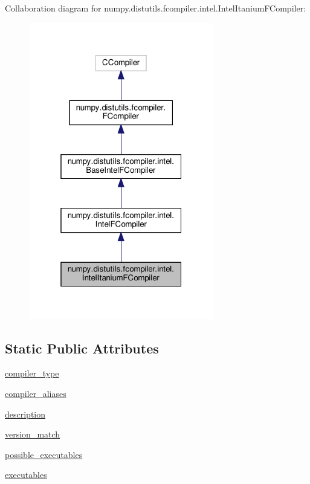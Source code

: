 Collaboration diagram for numpy.\+distutils.\+fcompiler.\+intel.\+Intel\+Itanium\+F\+Compiler\+:
\nopagebreak
\begin{figure}[H]
\begin{center}
\leavevmode
\includegraphics[width=229pt]{classnumpy_1_1distutils_1_1fcompiler_1_1intel_1_1IntelItaniumFCompiler__coll__graph}
\end{center}
\end{figure}
\subsection*{Static Public Attributes}
\begin{DoxyCompactItemize}
\item 
\hyperlink{classnumpy_1_1distutils_1_1fcompiler_1_1intel_1_1IntelItaniumFCompiler_af01546b8ccb8f4840cc178668d1f5714}{compiler\+\_\+type}
\item 
\hyperlink{classnumpy_1_1distutils_1_1fcompiler_1_1intel_1_1IntelItaniumFCompiler_a525a31c01dc45b34438f55a7e828f0c4}{compiler\+\_\+aliases}
\item 
\hyperlink{classnumpy_1_1distutils_1_1fcompiler_1_1intel_1_1IntelItaniumFCompiler_a329ae4c80b852ffabe653c76c86dc30c}{description}
\item 
\hyperlink{classnumpy_1_1distutils_1_1fcompiler_1_1intel_1_1IntelItaniumFCompiler_aa47643fed094b13cb20ecba51c7ffe21}{version\+\_\+match}
\item 
\hyperlink{classnumpy_1_1distutils_1_1fcompiler_1_1intel_1_1IntelItaniumFCompiler_a31421d2fb1d6edcdbd775bca03381136}{possible\+\_\+executables}
\item 
\hyperlink{classnumpy_1_1distutils_1_1fcompiler_1_1intel_1_1IntelItaniumFCompiler_a4bad966f324fdb412c86078465f5e898}{executables}
\end{DoxyCompactItemize}
